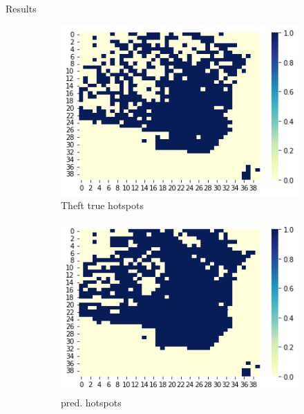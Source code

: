 \documentclass[10pt]{beamer}
\begin{document}
\begin{frame}{Results}
\begin{figure}[!htb]
{    
    \begin{subfigure}{.32\textwidth}
        \centering
        \includegraphics[width=1\linewidth, height=0.3\textheight]{true_theft_hotspots.png}
        \caption{Theft true hotspots}
    \end{subfigure}%
    \begin{subfigure}{0.32\textwidth}
        \centering
        \includegraphics[width=1\linewidth, height=0.3\textheight]{pred_theft_hotspots.png}
        \caption{pred. hotspots}
    \end{subfigure}%
    \begin{subfigure}{0.32\textwidth}
        \centering

\end{subfigure}}
\end{figure}
\end{frame}
\end{document}
